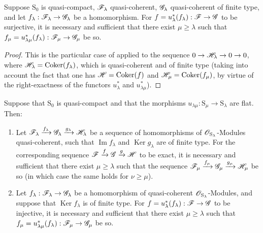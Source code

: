 \begin{corollary}[8.5.7]
\label{IV.8.5.7}
Suppose $\mathrm{S}_0$ is quasi-compact, $\mathscr{F}_\lambda$ quasi-coherent, $\mathscr{G}_\lambda$ quasi-coherent of finite type, and let $f_\lambda:\mathscr{F}_\lambda\to\mathscr{G}_\lambda$ be a homomorphism.
For $f=u_\lambda^*(f_\lambda):\mathscr{F}\to\mathscr{G}$ to be surjective, it is necessary and sufficient that there exist $\mu\geqslant\lambda$ such that $f_\mu=u_{\lambda\mu}^*(f_\lambda):\mathscr{F}_\mu\to\mathscr{G}_\mu$ be so.
\end{corollary}

\begin{proof}
This is the particular case of  applied to the sequence $0\to\mathscr{H}_\lambda\to 0\to 0$, where $\mathscr{H}_\lambda=\operatorname{Coker}(f_\lambda)$, which is quasi-coherent and of finite type (taking into account the fact that one has $\mathscr{H}=\operatorname{Coker}(f)$ and $\mathscr{H}_\mu=\operatorname{Coker}(f_\mu)$, by virtue of the right-exactness of the functors $u_\lambda^*$ and $u_{\lambda\mu}^*$).
\end{proof}

\begin{corollary}[8.5.8]
\label{IV.8.5.8}
Suppose that $\mathrm{S}_0$ is quasi-compact and that the morphisms $u_{\lambda\mu}:\mathrm{S}_\mu\to\mathrm{S}_\lambda$ are flat.
Then:
\begin{enumerate}[label=(\roman*)]
  \item Let $\mathscr{F}_\lambda\xrightarrow{f_\lambda}\mathscr{G}_\lambda\xrightarrow{g_\lambda}\mathscr{H}_\lambda$ be a sequence of homomorphisms of $\mathscr{O}_{\mathrm{S}_\lambda}$-Modules quasi-coherent, such that $\operatorname{Im} f_\lambda$ and $\operatorname{Ker} g_\lambda$ are of finite type.
For the corresponding sequence $\mathscr{F}\xrightarrow{f}\mathscr{G}\xrightarrow{g}\mathscr{H}$ to be
exact, it is necessary and sufficient that there exist $\mu\geqslant\lambda$ such that the sequence $\mathscr{F}_\mu\xrightarrow{f_\mu}\mathscr{G}_\mu\xrightarrow{g_\mu}\mathscr{H}_\mu$ be so (in which case the same holds for $\nu\geqslant\mu$).
  \item Let $f_\lambda:\mathscr{F}_\lambda\to\mathscr{G}_\lambda$ be a homomorphism of quasi-coherent $\mathscr{O}_{\mathrm{S}_\lambda}$-Modules, and suppose that $\operatorname{Ker} f_\lambda$ is of finite type.
For $f=u_\lambda^*(f_\lambda):\mathscr{F}\to\mathscr{G}$ to be injective, it is necessary and sufficient that there exist $\mu\geqslant\lambda$ such that $f_\mu=u_{\lambda\mu}^*(f_\lambda):\mathscr{F}_\mu\to\mathscr{G}_\mu$ be so.
\end{enumerate}
\end{corollary}

